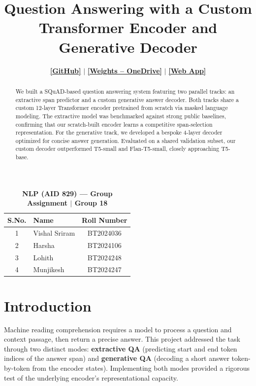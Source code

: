 \documentclass[10pt,twocolumn]{article}
\title{\vspace{-1.5em}\textbf{Question Answering with a Custom Transformer Encoder and Generative Decoder}\vspace{-0.5em}}
\author{\href{https://github.com/Harsha081459/Question-Answer-System-with-a-Custom-Transformer-Encoder-and-Generative-Decoder}{\textbf{[GitHub]}} \quad $\mid$ \quad \href{https://iiitbac-my.sharepoint.com/:f:/g/personal/vishal_sriram_iiitb_ac_in/IgBJMBmHEodfQba6fYpup9aiAdhsUH577v5oWa_W0i20VqM?e=j7DCc6}
{\textbf{[Weights -- OneDrive]}} \quad $\mid$ \quad \href{https://huggingface.co/spaces/hv-123/QA-Engine}{\textbf{[Web App]}}}
\date{}
\begin{document}
\maketitle
\vspace{-2.5em}

\begin{table}[H]
\centering
\small
\caption*{\textbf{NLP (AID 829) --- Group Assignment $\mid$ Group 18}}
\vspace{-0.5em}
\begin{tabular}{@{}clc@{}}
\toprule
\textbf{S.No.} & \textbf{Name} & \textbf{Roll Number} \\
\midrule
1 & Vishal Sriram & BT2024036 \\
2 & Harsha & BT2024106 \\
3 & Lohith & BT2024248 \\
4 & Munjikesh & BT2024247 \\
\bottomrule
\end{tabular}
\end{table}
\vspace{-0.5em}

\begin{abstract}
We built a SQuAD-based question answering system featuring two parallel tracks: an extractive span predictor and a custom generative answer decoder. Both tracks share a custom 12-layer Transformer encoder pretrained from scratch via masked language modeling. The extractive model was benchmarked against strong public baselines, confirming that our scratch-built encoder learns a competitive span-selection representation. For the generative track, we developed a bespoke 4-layer decoder optimized for concise answer generation. Evaluated on a shared validation subset, our custom decoder outperformed T5-small and Flan-T5-small, closely approaching T5-base.
\end{abstract}

\section{Introduction}
Machine reading comprehension requires a model to process a question and context passage, then return a precise answer. This project addressed the task through two distinct modes: \textbf{extractive QA} (predicting start and end token indices of the answer span) and \textbf{generative QA} (decoding a short answer token-by-token from the encoder states). Implementing both modes provided a rigorous test of the underlying encoder's representational capacity.
\end{document}
